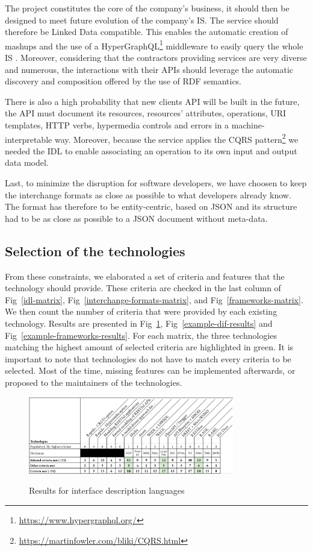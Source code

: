The project constitutes the core of the company's business, it should then be designed to meet future evolution of the company's IS. 
The service should therefore be Linked Data compatible. This enables the automatic creation of mashups and the use of a HyperGraphQL\footnote{\url{https://www.hypergraphql.org/}} middleware to easily query the whole IS \cite{Tuchinda:2011:BMD:1993053.1993058}.
Moreover, considering that the contractors providing services are very diverse and numerous, the interactions with their APIs should leverage the automatic discovery and composition offered by the use of RDF semantics.

There is also a high probability that new clients API will be built in the future, the API must document its resources, resources' attributes, operations, URI templates, HTTP verbs, hypermedia controls and errors in a machine-interpretable way. Moreover, because the service applies the CQRS pattern\footnote{\url{https://martinfowler.com/bliki/CQRS.html}} we needed the IDL to enable associating an operation to its own input and output data model.

Last, to minimize the disruption for software developers, we have choosen to keep the interchange formats  as close as possible to what developers already know. The format has therefore to be entity-centric, based on JSON and its structure had to be as close as possible to a JSON document without meta-data.

\subsection{Selection of the technologies}

From these constraints, we elaborated a set of criteria and features that the technology should provide. These criteria are checked  in the last column  of Fig~\ref{idl-matrix}, Fig~\ref{interchange-formats-matrix}, and Fig~\ref{frameworks-matrix}. 
We then count the number of criteria that were provided by each existing technology. 
Results are presented in Fig~\ref{example-idl-results}, Fig~\ref{example-dif-results} and Fig~\ref{example-frameworks-results}. 
For each matrix, the three technologies matching the highest amount of selected criteria are highlighted in green.
It is important to note that technologies do not have to match every criteria to be selected.
Most of the time, missing features can be implemented afterwards, or proposed to the maintainers of the technologies.
\vspace*{-0.5cm}
\begin{figure}[ht]
\caption{Results for interface description languages}
\centering
\includegraphics[width=0.8\textwidth]{figures/example-idl-results.png}
\label{example-idl-results}
\vspace*{-0.5cm}
\end{figure}

